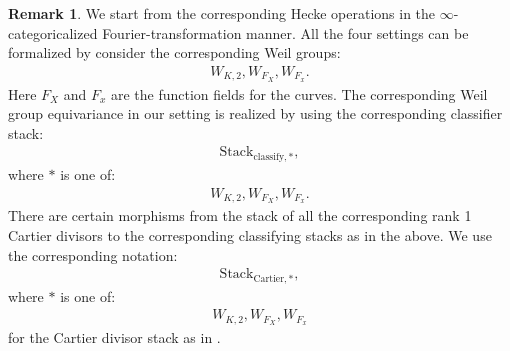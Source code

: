 \documentclass[12pt]{book}
\theoremstyle{definition}
\newtheorem{remark}{Remark}
\begin{document}
\begin{remark}
We start from the corresponding Hecke operations in the $\infty$-categoricalized Fourier-transformation manner. All the four settings can be formalized by consider the corresponding Weil groups:
\begin{align}
W_{K,2},W_{F_X},W_{F_x}.
\end{align}
Here $F_X$ and $F_x$ are the function fields for the curves. The corresponding Weil group equivariance in our setting is realized by using the corresponding classifier stack:
\begin{align}
\mathrm{Stack}_{\mathrm{classify},*}, 
\end{align}
where $*$ is one of:
\begin{align}
W_{K,2},W_{F_X},W_{F_x}.
\end{align}
There are certain morphisms from the stack of all the corresponding rank 1 Cartier divisors to the corresponding classifying stacks as in the above. We use the corresponding notation: 
\begin{align}
\mathrm{Stack}_{\mathrm{Cartier},*}, 
\end{align}
where $*$ is one of:
\begin{align}
W_{K,2},W_{F_X},W_{F_x}
\end{align}
for the Cartier divisor stack as in \cite{FS}.
\end{remark}
\end{document}
